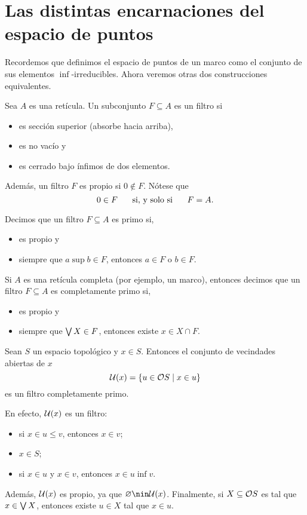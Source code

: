 \section{Las distintas encarnaciones del espacio de puntos}

Recordemos que definimos el espacio de puntos de un marco
como el conjunto de sus elementos $\inf$-irreducibles.
Ahora veremos otras dos construcciones equivalentes.

\begin{defn}
    Sea $A$ es una retícula.
    Un subconjunto $F\subseteq A$ es un filtro si
    \begin{itemize}
        \item es sección superior (absorbe hacia arriba),
        \item es no vacío y
        \item es cerrado bajo ínfimos de dos elementos.
    \end{itemize}
    Además, un filtro $F$ es propio si $0\nin F$.
    Nótese que
    \[
        0\in F \ssi F=A
    .\]
    
    Decimos que un filtro $F\subseteq A$ es primo si,
    \begin{itemize}
        \item es propio y
        \item siempre que $a\sup b\in F$, entonces $a\in F$ o $b\in F$.
    \end{itemize}
    
    Si $A$ es una retícula completa (por ejemplo, un marco),
    entonces decimos que un filtro $F\subseteq A$ es completamente
    primo si,
    \begin{itemize}
        \item es propio y
        \item siempre que $\Sup X\in F$, entonces existe $x\in X\cap F$.
    \end{itemize}
\end{defn}

\begin{exa}
    Sean $S$ un espacio topológico y $x\in S$.
    Entonces el conjunto de vecindades abiertas de $x$
    \[
        \cal U(x) = \{u\in \cal OS\mid x\in u\}
    \]
    es un filtro completamente primo.
    
    En efecto, $\cal U(x)$ es un filtro:
    \begin{itemize}
        \item si $x\in u\leq v$, entonces $x\in v$;
        \item $x\in S$;
        \item si $x\in u$ y $x\in v$, entonces $x\in u\inf v$.
    \end{itemize}
    Además,  $\cal U(x)$ es propio, ya que $\emptyset\nin\cal U(x)$.
    Finalmente, si $X\subseteq \cal OS$ es tal que $x\in \Sup X$,
    entonces existe $u\in X$ tal que $x\in u$.
\end{exa}


